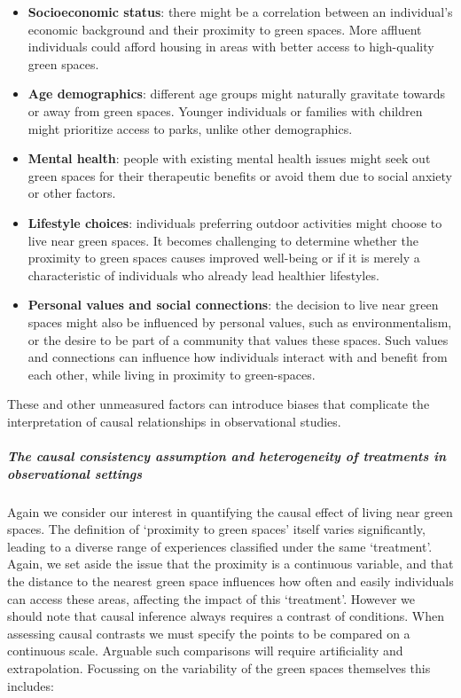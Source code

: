\documentclass[
  singlecolumn]{article}
\let\oldsubparagraph\subparagraph
\renewcommand{\subparagraph}[1]{\oldsubparagraph{#1}\mbox{}}
\begin{document}
\begin{itemize}
\item
  \textbf{Socioeconomic status}: there might be a correlation between an
  individual's economic background and their proximity to green spaces.
  More affluent individuals could afford housing in areas with better
  access to high-quality green spaces.
\item
  \textbf{Age demographics}: different age groups might naturally
  gravitate towards or away from green spaces. Younger individuals or
  families with children might prioritize access to parks, unlike other
  demographics.
\item
  \textbf{Mental health}: people with existing mental health issues
  might seek out green spaces for their therapeutic benefits or avoid
  them due to social anxiety or other factors.
\item
  \textbf{Lifestyle choices}: individuals preferring outdoor activities
  might choose to live near green spaces. It becomes challenging to
  determine whether the proximity to green spaces causes improved
  well-being or if it is merely a characteristic of individuals who
  already lead healthier lifestyles.
\item
  \textbf{Personal values and social connections}: the decision to live
  near green spaces might also be influenced by personal values, such as
  environmentalism, or the desire to be part of a community that values
  these spaces. Such values and connections can influence how
  individuals interact with and benefit from each other, while living in
  proximity to green-spaces.
\end{itemize}

These and other unmeasured factors can introduce biases that complicate
the interpretation of causal relationships in observational studies.

\subparagraph{The causal consistency assumption and heterogeneity of
treatments in observational
settings}\label{the-causal-consistency-assumption-and-heterogeneity-of-treatments-in-observational-settings}

Again we consider our interest in quantifying the causal effect of
living near green spaces. The definition of `proximity to green spaces'
itself varies significantly, leading to a diverse range of experiences
classified under the same `treatment'. Again, we set aside the issue
that the proximity is a continuous variable, and that the distance to
the nearest green space influences how often and easily individuals can
access these areas, affecting the impact of this `treatment'. However we
should note that causal inference always requires a contrast of
conditions. When assessing causal contrasts we must specify the points
to be compared on a continuous scale. Arguable such comparisons will
require artificiality and extrapolation. Focussing on the variability of
the green spaces themselves this includes:
\end{document}
